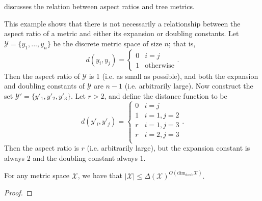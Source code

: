 \documentclass[../main.tex]{subfiles}
\newcommand{\set}[1]{\mathcal {#1}}
\newcommand{\dist}[2]{\distf({#1},{#2})}
\newcommand{\distf}{d}
\newcommand{\aspect}[1]{\Delta({#1})}
\newcommand{\doubdim}{\text{dim}_\text{doub}}
\begin{document}
\cite{bartal2003metric} discusses the relation between aspect ratios and tree metrics.

\begin{example}
    This example shows that there is not necessarily a relationship between the aspect ratio of a metric and either its expansion or doubling constants.
    Let $\set Y=\{y_1,...,y_n\}$ be the discrete metric space of size $n$;
    that is,
    \begin{equation}
        \dist{y_i}{y_j}=
        \begin{cases}
            0 & i = j \\
            1 & \text{otherwise}
        \end{cases}
        .
    \end{equation}
    Then the aspect ratio of $\set Y$ is 1 (i.e. as small as possible),
    and both the expansion and doubling constants of $\set Y$ are $n-1$ (i.e. arbitrarily large).
    Now construct the set $\set Y'=\{y'_1, y'_2, y'_3\}$.
    Let $r>2$, and define the distance function to be
    \begin{equation}
        d(y'_i,y'_j) =
        \begin{cases}
            0 & i=j \\
            1 & i=1, j=2 \\
            r & i=1, j=3 \\
            r & i=2, j=3 \\
        \end{cases}
        .
    \end{equation}
    Then the aspect ratio is $r$ (i.e. arbitrarily large),
    but the expansion constant is always 2
    and the doubling constant always 1.
\end{example}

\begin{lemma}
    For any metric space $\set X$, we have that
    $
        |\set X| \le \aspect{\set X}^{O(\doubdim{\set X})}.
    $
\end{lemma}
\begin{proof}
\end{proof}

\end{document}

